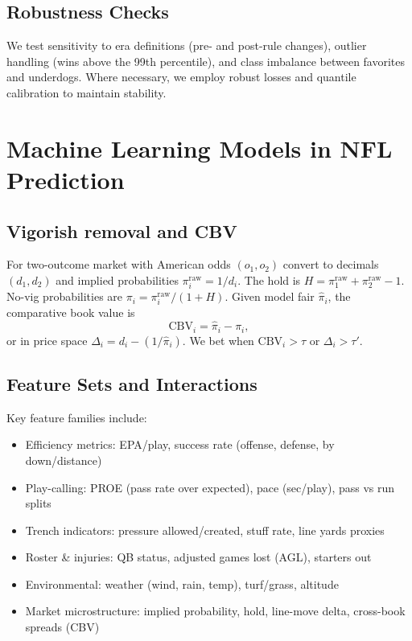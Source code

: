 \subsection{Robustness Checks}
We test sensitivity to era definitions (pre- and post-rule changes), outlier handling (wins above the 99th percentile), and class imbalance between favorites and underdogs. Where necessary, we employ robust losses and quantile calibration to maintain stability.

\section{Machine Learning Models in NFL Prediction}
\label{sec:ml}

\subsection{Vigorish removal and CBV}\label{subsec:vig-cbv-lit}
For two-outcome market with American odds $(o_1,o_2)$ convert to decimals $(d_1,d_2)$ and implied
probabilities $\pi_i^{\mathrm{raw}}=1/d_i$. The hold is $H=\pi_1^{\mathrm{raw}}+\pi_2^{\mathrm{raw}}-1$.
No-vig probabilities are $\pi_i=\pi_i^{\mathrm{raw}}/(1+H)$. Given model fair $\hat\pi_i$, the
comparative book value is
\[
\mathrm{CBV}_i=\hat\pi_i-\pi_i,
\]
or in price space $\Delta_i = d_i - (1/\hat\pi_i)$. We bet when $\mathrm{CBV}_i>\tau$ or $\Delta_i>\tau'$.

\subsection{Feature Sets and Interactions}
Key feature families include:
\begin{itemize}
  \item Efficiency metrics: EPA/play, success rate (offense, defense, by down/distance)
  \item Play-calling: PROE (pass rate over expected), pace (sec/play), pass vs run splits
  \item Trench indicators: pressure allowed/created, stuff rate, line yards proxies
  \item Roster \& injuries: QB status, adjusted games lost (AGL), starters out
  \item Environmental: weather (wind, rain, temp), turf/grass, altitude
  \item Market microstructure: implied probability, hold, line-move delta, cross-book spreads (CBV)
\end{itemize}

